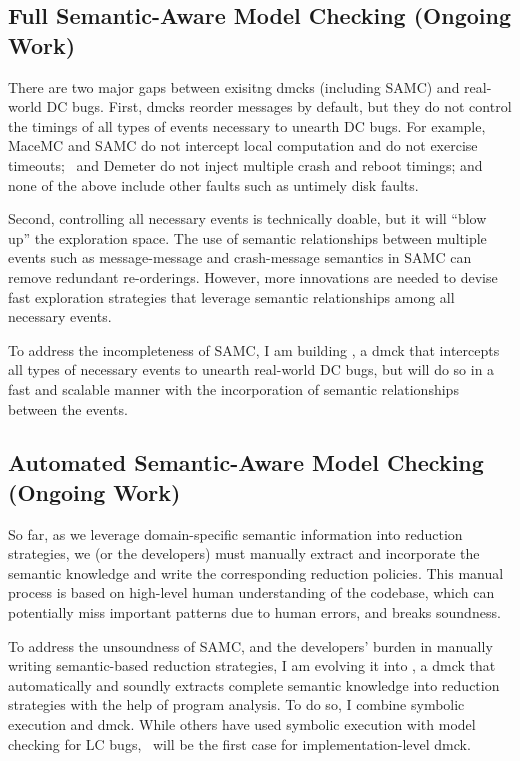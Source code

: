\documentclass[11pt]{article}
\begin{document}
\subsection{Full Semantic-Aware Model Checking (Ongoing Work)} 

There are two major gaps between exisitng dmcks (including SAMC) and real-world
DC bugs. First, dmcks reorder messages by default, but they do not control the
timings of all types of events necessary to unearth DC bugs. For example, MaceMC
and SAMC do not intercept local computation and do not exercise timeouts;
\modist\ and Demeter do not inject multiple crash and reboot timings; and none
of the above include other faults such as untimely disk faults.

Second, controlling all necessary events is technically doable, but it will
``blow up'' the exploration space. The use of semantic relationships between
multiple events such as message-message and crash-message semantics in SAMC can
remove redundant re-orderings. However, more innovations are needed to devise
fast exploration strategies that leverage semantic relationships among all
necessary events.

To address the incompleteness of SAMC, I am building \fullcheck, a dmck that
intercepts all types of necessary events to unearth real-world DC bugs, but
will do so in a fast and scalable manner with the incorporation of semantic
relationships between the events.


\subsection{Automated Semantic-Aware Model Checking (Ongoing Work)} 

So far, as we leverage domain-specific semantic information into reduction
strategies, we (or the developers) must manually extract and incorporate the
semantic knowledge and write the corresponding reduction policies. This manual
process is based on high-level human understanding of the codebase, which can
potentially miss important patterns due to human errors, and breaks soundness.

To address the unsoundness of SAMC, and the developers' burden in manually
writing semantic-based reduction strategies, I am evolving it into \autocheck,
a dmck that automatically and soundly extracts complete semantic knowledge into
reduction strategies with the help of program analysis.
%
To do so, I combine symbolic execution and dmck. While others have used symbolic
execution with model checking for LC bugs, \autocheck\ will be the first case for
implementation-level dmck. 
\end{document}
